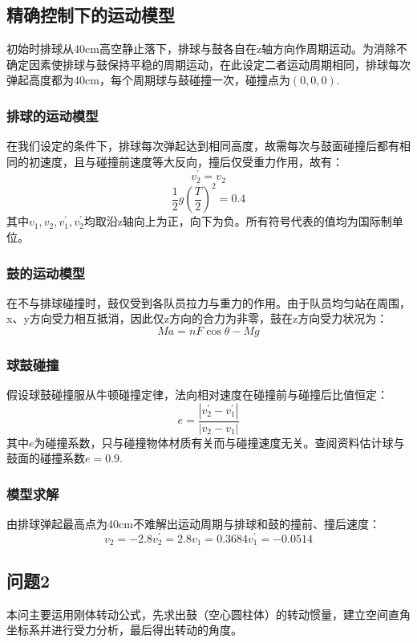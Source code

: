 \documentclass{cumcmthesis}
\begin{document}
\subsection{精确控制下的运动模型}
初始时排球从40cm高空静止落下，排球与鼓各自在z轴方向作周期运动。为消除不确定因素使排球与鼓保持平稳的周期运动，在此设定二者运动周期相同，排球每次弹起高度都为40cm，每个周期球与鼓碰撞一次，碰撞点为$(0,0,0)$.
\subsubsection{排球的运动模型}
在我们设定的条件下，排球每次弹起达到相同高度，故需每次与鼓面碰撞后都有相同的初速度，且与碰撞前速度等大反向，撞后仅受重力作用，故有：$$v_2^{'}=v_2$$ $$\frac{1}{2}g(\frac{T}{2})^2=0.4$$
其中$v_1, v_2, v_1^{'}, v_2^{'}$均取沿z轴向上为正，向下为负。所有符号代表的值均为国际制单位。
\subsubsection{鼓的运动模型}
在不与排球碰撞时，鼓仅受到各队员拉力与重力的作用。由于队员均匀站在周围，x、y方向受力相互抵消，因此仅z方向的合力为非零，鼓在z方向受力状况为：
$$Ma=nF\cos\theta-Mg$$
\subsubsection{球鼓碰撞}
假设球鼓碰撞服从牛顿碰撞定律，法向相对速度在碰撞前与碰撞后比值恒定：
$$e=\frac{|v_2^{'}-v_1^{'}|}{|v_2-v_1|}$$
其中$e$为碰撞系数，只与碰撞物体材质有关而与碰撞速度无关。查阅资料估计球与鼓面的碰撞系数$e=0.9$.
\subsubsection{模型求解}
由排球弹起最高点为40cm不难解出运动周期与排球和鼓的撞前、撞后速度：
\begin{equation*}
v_2 = -2.8
v_2^{'} = 2.8
v_1 = 0.3684
v_1^{'} = -0.0514
\end{equation*}

\subsection{问题2}
本问主要运用刚体转动公式，先求出鼓（空心圆柱体）的转动惯量，建立空间直角坐标系并进行受力分析，最后得出转动的角度。
\end{document}
